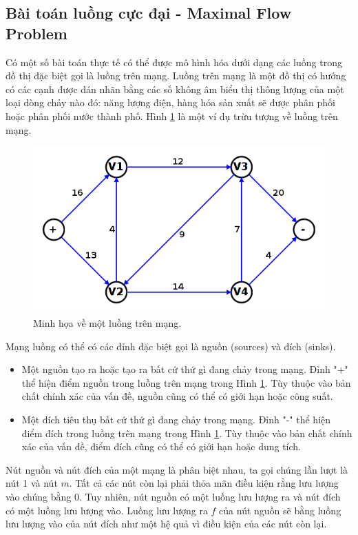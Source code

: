 \subsection{Bài toán luồng cực đại - Maximal Flow Problem}

Có một số bài toán thực tế có thể được mô hình hóa dưới dạng các luồng trong đồ thị đặc biệt gọi là luồng trên mạng. Luồng trên mạng là một đồ thị có hướng có các cạnh được dán nhãn bằng các số không âm biểu thị thông lượng của một loại dòng chảy nào đó: năng lượng điện, hàng hóa sản xuất sẽ được phân phối hoặc phân phối nước thành phố. Hình \ref{fig:flow_network} là một ví dụ trừu tượng về luồng trên mạng.

\begin{figure}[h!]
    \includegraphics[width=0.85\linewidth]{figures/flow-network.png}
    \caption{Minh họa về một luồng trên mạng.}
    \label{fig:flow_network}
\end{figure}

Mạng luồng có thể có các đỉnh đặc biệt gọi là nguồn (sources) và đích (sinks).
\begin{itemize}
    \item Một nguồn tạo ra hoặc tạo ra bất cứ thứ gì đang chảy trong mạng. Đỉnh "+" thể hiện điểm nguồn trong luồng trên mạng trong Hình \ref{fig:flow_network}. Tùy thuộc vào bản chất chính xác của vấn đề, nguồn cũng có thể có giới hạn hoặc công suất.
    \item Một đích tiêu thụ bất cứ thứ gì đang chảy trong mạng. Đỉnh "-" thể hiện điểm đích trong luồng trên mạng trong Hình \ref{fig:flow_network}. Tùy thuộc vào bản chất chính xác của vấn đề, điểm đích cũng có thể có giới hạn hoặc dung tích.
\end{itemize}

Nút nguồn và nút đích của một mạng là phân biệt nhau, ta gọi chúng lần lượt là nút 1 và nút $m$. Tất cả các nút còn lại phải thỏa mãn điều kiện rằng lưu lượng vào chúng bằng 0. Tuy nhiên, nút nguồn có một luồng lưu lượng ra và nút đích có một luồng lưu lượng vào. Luồng lưu lượng ra $f$ của nút nguồn sẽ bằng luồng lưu lượng vào của nút đích như một hệ quả vì điều kiện của các nút còn lại. 

